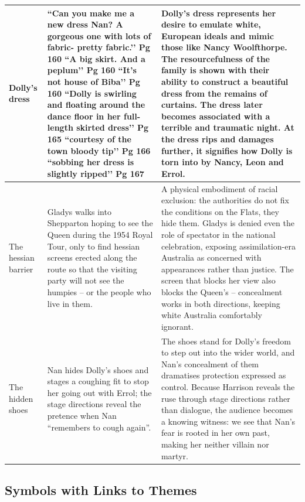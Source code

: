 \documentclass[a4paper]{article}
\begin{document}
\begin{longtable}{|p{2cm}|p{4cm}|p{7cm}|}
Dolly’s dress &
``Can you make me a new dress Nan? A gorgeous one with lots of fabric- pretty fabric.’’ Pg 160 \newline
``A big skirt. And a peplum’’ Pg 160 \newline
``It’s not house of Biba’’ Pg 160 \newline
``Dolly is swirling and floating around the dance floor in her full-length skirted dress’’ Pg 165 \newline
``courtesy of the town bloody tip’’ Pg 166 \newline
``sobbing her dress is slightly ripped’’ Pg 167 &
Dolly’s dress represents her desire to emulate white, European ideals and mimic those like Nancy Woolfthorpe. The resourcefulness of the family is shown with their ability to construct a beautiful dress from the remains of curtains. The dress later becomes associated with a terrible and traumatic night. At the dress rips and damages further, it signifies how Dolly is torn into by Nancy, Leon and Errol. \\
\hline

The hessian barrier &
Gladys walks into Shepparton hoping to see the Queen during the 1954 Royal Tour, only to find hessian screens erected along the route so that the visiting party will not see the humpies -- or the people who live in them. &
A physical embodiment of racial exclusion: the authorities do not fix the conditions on the Flats, they hide them. Gladys is denied even the role of spectator in the national celebration, exposing assimilation-era Australia as concerned with appearances rather than justice. The screen that blocks her view also blocks the Queen's -- concealment works in both directions, keeping white Australia comfortably ignorant. \\
\hline

The hidden shoes &
Nan hides Dolly's shoes and stages a coughing fit to stop her going out with Errol; the stage directions reveal the pretence when Nan ``remembers to cough again''. &
The shoes stand for Dolly's freedom to step out into the wider world, and Nan's concealment of them dramatises protection expressed as control. Because Harrison reveals the ruse through stage directions rather than dialogue, the audience becomes a knowing witness: we see that Nan's fear is rooted in her own past, making her neither villain nor martyr. \\
\hline

\end{longtable}

\subsection{Symbols with Links to Themes}
\end{document}
